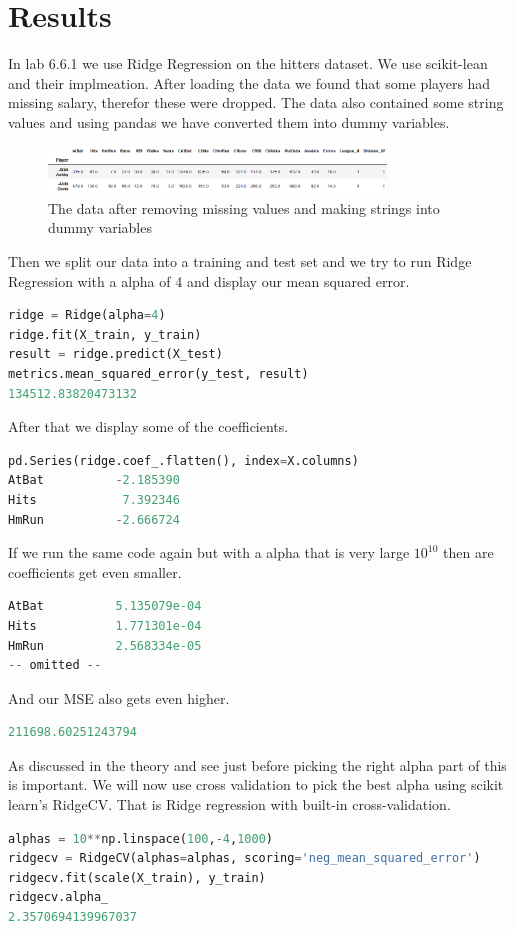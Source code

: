 \section{Results}
In lab 6.6.1 we use Ridge Regression on the hitters dataset. We use scikit-lean and their implmeation. After loading the data we found that some players had missing salary, therefor these were dropped. The data also contained some string values and using pandas we have converted them into dummy variables.  
\begin{figure}[H]
	\centering
	\includegraphics[width=0.8\textwidth]{shrinkageMethods/fig/data.png}
	\caption{The data after removing missing values and making strings into dummy variables }
	\label{fig:normfirstsecond}
\end{figure}
Then we split our data into a training and test set and we try to run Ridge Regression with a alpha of 4 and display our mean squared error.
\begin{lstlisting}[language=Python]
ridge = Ridge(alpha=4)
ridge.fit(X_train, y_train)
result = ridge.predict(X_test)
metrics.mean_squared_error(y_test, result)
134512.83820473132
\end{lstlisting}
After that we display some of the coefficients.
\begin{lstlisting}[language=Python]
pd.Series(ridge.coef_.flatten(), index=X.columns)
AtBat          -2.185390
Hits            7.392346
HmRun          -2.666724
\end{lstlisting}
If we run the same code again but with a alpha that is very large $10^10$ then are coefficients get even smaller.
\begin{lstlisting}[language=Python]
AtBat          5.135079e-04
Hits           1.771301e-04
HmRun          2.568334e-05
-- omitted --
\end{lstlisting}
And our MSE also gets even higher.
\begin{lstlisting}[language=Python]
211698.60251243794
\end{lstlisting}
As discussed in the theory and see just before picking the right alpha part of this is important. We will now use cross validation to pick the best alpha using scikit learn's RidgeCV. That is Ridge regression with built-in cross-validation.
\begin{lstlisting}[language=Python]
alphas = 10**np.linspace(100,-4,1000)
ridgecv = RidgeCV(alphas=alphas, scoring='neg_mean_squared_error')
ridgecv.fit(scale(X_train), y_train)
ridgecv.alpha_
2.3570694139967037
\end{lstlisting}
